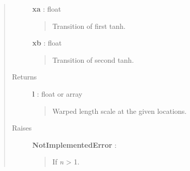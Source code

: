 \documentclass[letterpaper,10pt,english]{sphinxmanual}
\begin{document}
\begin{fulllineitems}
\begin{quote}
\begin{description}
\textbf{xa} : float
\begin{quote}

Transition of first tanh.
\end{quote}

\textbf{xb} : float
\begin{quote}

Transition of second tanh.
\end{quote}

\item[{Returns}] \leavevmode
\textbf{l} : float or array
\begin{quote}

Warped length scale at the given locations.
\end{quote}

\item[{Raises}] \leavevmode
\textbf{NotImplementedError} :
\begin{quote}

If \emph{n} \textgreater{} 1.
\end{quote}

\end{description}\end{quote}

\end{fulllineitems}

\end{document}
